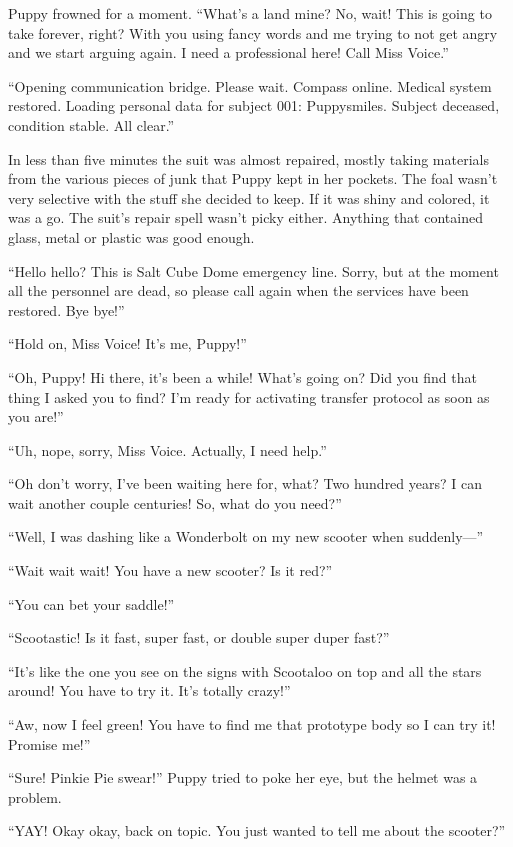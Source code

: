 Puppy frowned for a moment. ``What's a land mine? No, wait! This is going to take forever, right? With you using fancy words and me trying to not get angry and we start arguing again. I need a professional here! Call Miss Voice.''

{\mt ``Opening communication bridge. Please wait. Compass online. Medical system restored. Loading personal data for subject 001: Puppysmiles. Subject deceased, condition stable. All clear.''}

In less than five minutes the suit was almost repaired, mostly taking materials from the various pieces of junk that Puppy kept in her pockets. The foal wasn't very selective with the stuff she decided to keep. If it was shiny and colored, it was a go. The suit's repair spell  wasn't picky either. Anything that contained glass, metal or plastic was good enough.

``Hello hello? This is Salt Cube Dome emergency line. Sorry, but at the moment all the personnel are dead, so please call again when the services have been restored. Bye bye!''

``Hold on, Miss Voice! It's me, Puppy!''

``Oh, Puppy! Hi there, it's been a while! What's going on? Did you find that thing I asked you to find? I'm ready for activating transfer protocol as soon as you are!''

``Uh, nope, sorry, Miss Voice. Actually, I need help.''

``Oh don't worry, I've been waiting here for, what? Two hundred years? I can wait another couple centuries! So, what do you need?''

``Well, I was dashing like a Wonderbolt on my new scooter when suddenly---''

``Wait wait wait! You have a new scooter? Is it red?''

``You can bet your saddle!''

``Scootastic! Is it fast, super fast, or double super duper fast?''

``It's like the one you see on the signs with Scootaloo on top and all the stars around! You have to try it. It's totally crazy!''

``Aw, now I feel green! You have to find me that prototype body so I can try it! Promise me!''

``Sure! Pinkie Pie swear!'' Puppy tried to poke her eye, but the helmet was a problem.

``YAY! Okay okay, back on topic. You just wanted to tell me about the scooter?''

